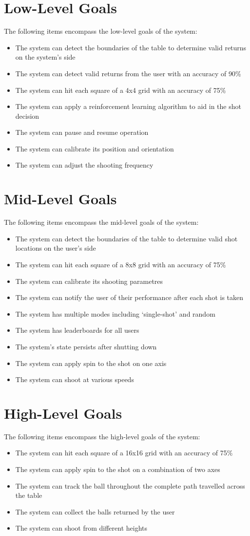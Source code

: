 \documentclass[11pt]{article}
\begin{document}
\section{Low-Level Goals}
The following items encompass the low-level goals of the system:
\begin{itemize}
\item The system can detect the boundaries of the table to determine valid returns on the system's side
\item The system can detect valid returns from the user with an accuracy of 90\%
\item The system can hit each square of a 4x4 grid with an accuracy of 75\%
\item The system can apply a reinforcement learning algorithm to aid in the shot decision
\item The system can pause and resume operation
\item The system can calibrate its position and orientation
\item The system can adjust the shooting frequency
\end{itemize}
\section{Mid-Level Goals}
The following items encompass the mid-level goals of the system:
\begin{itemize}
\item The system can detect the boundaries of the table to determine valid shot locations on the user's side
\item The system can hit each square of a 8x8 grid with an accuracy of 75\%
\item The system can calibrate its shooting parametres
\item The system can notify the user of their performance after each shot is taken
\item The system has multiple modes including `single-shot' and random
\item The system has leaderboards for all users
\item The system's state persists after shutting down
\item The system can apply spin to the shot on one axis
\item The system can shoot at various speeds
\end{itemize}
\section{High-Level Goals}
The following items encompass the high-level goals of the system:
\begin{itemize}
\item The system can hit each square of a 16x16 grid with an accuracy of 75\%
\item The system can apply spin to the shot on a combination of two axes
\item The system can track the ball throughout the complete path travelled across the table
\item The system can collect the balls returned by the user
\item The system can shoot from different heights
\end{itemize}
\end{document}
